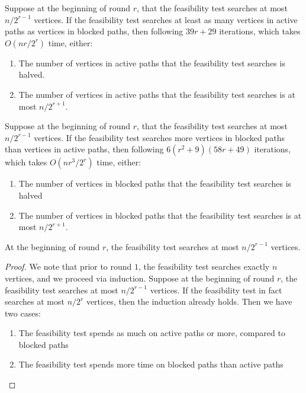 \documentclass[12pt]{article}
\begin{document}
\begin{spacing}{3}
\begin{lemma}
\label{lem:active:paths}
Suppose at the beginning of round $r$, that the feasibility test searches at most $n/2^{r-1}$ vertices. If the feasibility test searches at least as many vertices in active paths as vertices in blocked paths, then following $39r+29$ iterations, which takes $O(nr/2^r)$ time, either:
\begin{enumerate}
\item
The number of vertices in active paths that the feasibility test searches is halved.
\item
The number of vertices in active paths that the feasibility test searches is at most $n/2^{r+1}$.
\end{enumerate}
\end{lemma}
\begin{lemma}
\label{lem:blocked:paths}
Suppose at the beginning of round $r$, that the feasibility test searches at most $n/2^{r-1}$ vertices. If the feasibility test searches more vertices in blocked paths than vertices in active paths, then following $6(r^2+9)(58r+49)$ iterations, which takes $O(nr^3/2^r)$ time, either:
\begin{enumerate}
\item
The number of vertices in blocked paths that the feasibility test searches is halved
\item
The number of vertices in blocked paths that the feasibility test searches is at most $n/2^{r+1}$.
\end{enumerate}
\end{lemma}
\begin{lemma}
\label{lem:m:r}
At the beginning of round $r$, the feasibility test searches at most $n/2^{r-1}$ vertices.
\end{lemma}
\begin{proof}
We note that prior to round $1$, the feasibility test searches exactly $n$ vertices, and we proceed via induction. Suppose at the beginning of round $r$, the feasibility test searches at most $n/2^{r-1}$ vertices. If the feasibility test in fact searches at most $n/2^r$ vertices, then the induction already holds. Then we have two cases:
\begin{enumerate}
\item
The feasibility test spends as much on active paths or more, compared to blocked paths
\item
The feasibility test spends more time on blocked paths than active paths
\end{enumerate}

\end{proof}
\end{spacing}
\end{document}
